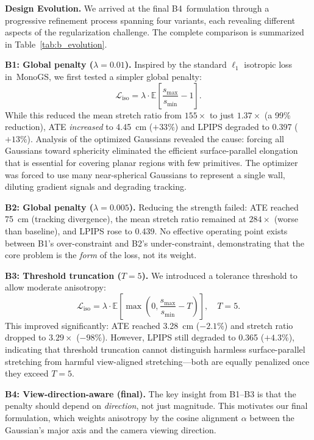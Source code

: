 \documentclass[conference]{IEEEtran}
\begin{document}
\textbf{Design Evolution.}
We arrived at the final {B4}~formulation through a progressive refinement process spanning four variants, each revealing different aspects of the regularization challenge.
The complete comparison is summarized in Table~\ref{tab:b_evolution}.

\textbf{B1: Global penalty ($\lambda=0.01$).}
Inspired by the standard $\ell_1$ isotropic loss in~MonoGS, we first tested a simpler global penalty:
\begin{equation}
\mathcal{L}_{\text{iso}} = \lambda \cdot \mathbb{E}\left[\frac{s_{\max}}{s_{\min}} - 1\right].
\end{equation}
While this reduced the mean stretch ratio from $155\times$ to just $1.37\times$ (a 99\% reduction), ATE \textit{increased} to 4.45~cm ($+33\%$) and LPIPS degraded to 0.397 ($+13\%$).
Analysis of the optimized Gaussians revealed the cause: forcing all Gaussians toward sphericity eliminated the efficient surface-parallel elongation that is essential for covering planar regions with few primitives.
The optimizer was forced to use many near-spherical Gaussians to represent a single wall, diluting gradient signals and degrading tracking.

\textbf{B2: Global penalty ($\lambda=0.005$).}
Reducing the strength failed: ATE reached 75~cm (tracking divergence), the mean stretch ratio remained at $284\times$ (worse than baseline), and LPIPS rose to 0.439.
No effective operating point exists between B1's over-constraint and B2's under-constraint, demonstrating that the core problem is the \textit{form} of the loss, not its weight.

\textbf{B3: Threshold truncation ($T=5$).}
We introduced a tolerance threshold to allow moderate anisotropy:
\begin{equation}
\mathcal{L}_{\text{iso}} = \lambda \cdot \mathbb{E}\left[\max\left(0, \frac{s_{\max}}{s_{\min}} - T\right)\right], \quad T=5.
\end{equation}
This improved significantly: ATE reached 3.28~cm ($-2.1\%$) and stretch ratio dropped to $3.29\times$ ($-98\%$).
However, LPIPS still degraded to 0.365 ($+4.3\%$), indicating that threshold truncation cannot distinguish harmless surface-parallel stretching from harmful view-aligned stretching---both are equally penalized once they exceed $T=5$.

\textbf{B4: View-direction-aware (final).}
The key insight from B1--B3 is that the penalty should depend on \textit{direction}, not just magnitude.
This motivates our final formulation, which weights anisotropy by the cosine alignment $\alpha$ between the Gaussian's major axis and the camera viewing direction.
\end{document}

